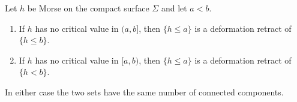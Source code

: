 \begin{corollary}
\label{cor:sublevel-stable}
Let $h$ be Morse on the compact surface $\Sigma$ and let $a<b$.
\begin{enumerate}[label=(\roman*)]
\item\label{it:retract-closed} If $h$ has no critical value in $(a,b]$, then
  $\{h\le a\}$ is a deformation retract of $\{h\le b\}$.
\item\label{it:retract-open} If $h$ has no critical value in $[a,b)$, then
  $\{h\le a\}$ is a deformation retract of $\{h<b\}$.
\end{enumerate}
In either case the two sets have the same number of connected components.
\end{corollary}

